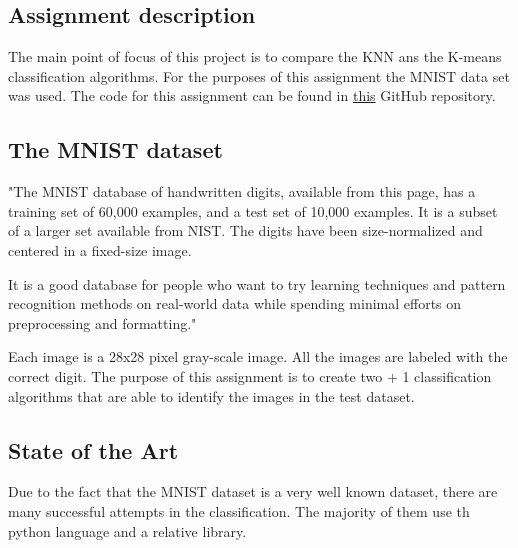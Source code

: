 \subsection*{Assignment description}
The main point of focus of this project is to compare the KNN ans the K-means classification algorithms. For the 
purposes of this assignment the MNIST data set was used. The code for this assignment can be found in 
\href{https://github.com/Billkyriaf/Neural_Networks_1}{this} GitHub repository.

\subsection*{The MNIST dataset}
"The MNIST database of handwritten digits, available from this page, has a training set of 60,000 examples, and
a test set of 10,000 examples. It is a subset of a larger set available from NIST. The digits have been size-normalized 
and centered in a fixed-size image.

It is a good database for people who want to try learning techniques and pattern recognition methods on real-world data
while spending minimal efforts on preprocessing and formatting." \cite{mnist} 

Each image is a 28x28 pixel gray-scale image. All the images are labeled with the correct digit. The purpose of this assignment
is to create two + 1 classification algorithms that are able to identify the images in the test dataset.

\subsection*{State of the Art}

Due to the fact that the MNIST dataset is a very well known dataset, there are many successful attempts in the classification.
The majority of them use th python language and a relative library.